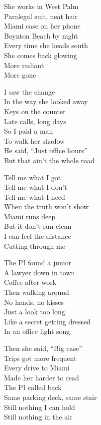 \begin{lyrics}

She works in West Palm\\
Paralegal suit, neat hair\\
Miami case on her phone\\
Boynton Beach by night\\
Every time she heads south\\
She comes back glowing\\
More radiant\\
More gone

I saw the change\\
In the way she looked away\\
Keys on the counter\\
Late calls, long days\\
So I paid a man\\
To walk her shadow\\
He said, “Just office hours”\\
But that ain’t the whole road

Tell me what I got\\
Tell me what I don’t\\
Tell me what I need\\
When the truth won’t show\\
Miami runs deep\\
But it don’t run clean\\
I can feel the distance\\
Cutting through me

The PI found a junior\\
A lawyer down in town\\
Coffee after work\\
Then walking around\\
No hands, no kisses\\
Just a look too long\\
Like a secret getting dressed\\
In an office light song

Then she said, “Big case”\\
Trips got more frequent\\
Every drive to Miami\\
Made her harder to read\\
The PI called back\\
Same parking deck, same stair\\
Still nothing I can hold\\
Still nothing in the air


\end{lyrics}
